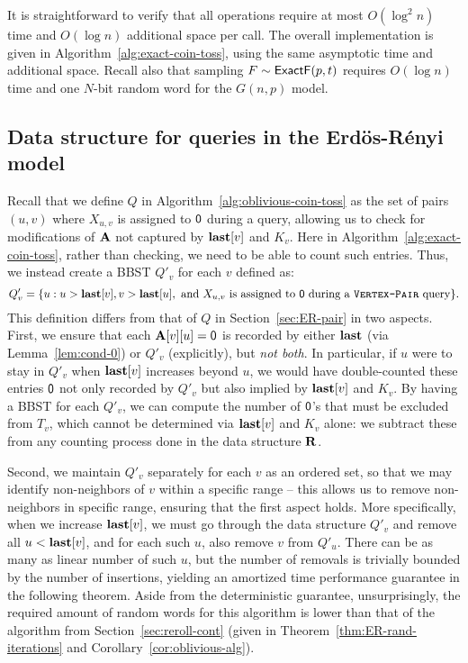 It is straightforward to verify that all operations require at most $O(\log^2 n)$ time and $O(\log n)$ additional space per call. The overall implementation is given in Algorithm~\ref{alg:exact-coin-toss}, using the same asymptotic time and additional space. Recall also that sampling $F\sim\mathsf{ExactF}(p,t)$ requires $O(\log n)$ time and one $N$-bit random word for the $G(n,p)$ model.

\subsection{Data structure for  queries in the Erd\"{o}s-R\'{e}nyi model}\label{sec:det-er-pair}
Recall that we define $Q$ in Algorithm~\ref{alg:oblivious-coin-toss} as the  set of pairs $(u,v)$ where $X_{u,v}$ is assigned to $\mathsf{0}$ during a  query, allowing us to check for modifications of $\mathbf{A}$ not captured by $\mathbf{last}[v]$ and $K_v$. Here in Algorithm~\ref{alg:exact-coin-toss}, rather than checking, we need to be able to count such entries. Thus, we instead create a BBST $Q'_v$ for each $v$ defined as:
\[Q'_v = \{u: u > \mathbf{last}[v], v > \mathbf{last}[u], \textrm{ and } X_{u,v}\textrm{ is assigned to }\mathsf{0} \textrm{ during a \texttt{\textsc{Vertex-Pair}} query}\}.\]
This definition differs from that of $Q$ in Section~\ref{sec:ER-pair} in two aspects. First, we ensure that each $\mathbf{A}[v][u] = \mathsf{0}$ is recorded by either $\mathbf{last}$ (via Lemma~\ref{lem:cond-0}) or $Q'_v$ (explicitly), but \emph{not both}. In particular, if $u$ were to stay in $Q'_v$ when $\mathbf{last}[v]$ increases beyond $u$, we would have double-counted these entries $\mathsf{0}$ not only recorded by $Q'_v$ but also implied by $\mathbf{last}[v]$ and $K_v$. By having a BBST for each $Q'_v$, we can compute the number of $\mathsf{0}$'s that must be excluded from $T_v$, which cannot be determined via $\mathbf{last}[v]$ and $K_v$ alone: we subtract these from any counting process done in the data structure $\mathbf{R}$.

Second, we maintain $Q'_v$ separately for each $v$ as an ordered set, so that we may identify non-neighbors of $v$ within a specific range -- this allows us to remove non-neighbors in specific range, ensuring that the first aspect holds. More specifically, when we increase $\mathbf{last}[v]$, we must go through the data structure $Q'_v$ and remove all $u < \mathbf{last}[v]$, and for each such $u$, also remove $v$ from $Q'_u$. There can be as many as linear number of such $u$, but the number of removals is trivially bounded by the number of insertions, yielding an amortized time performance guarantee in the following theorem. Aside from the deterministic guarantee, unsurprisingly, the required amount of random words for this algorithm is lower than that of the algorithm from Section~\ref{sec:reroll-cont} (given in Theorem~\ref{thm:ER-rand-iterations} and Corollary~\ref{cor:oblivious-alg}).


